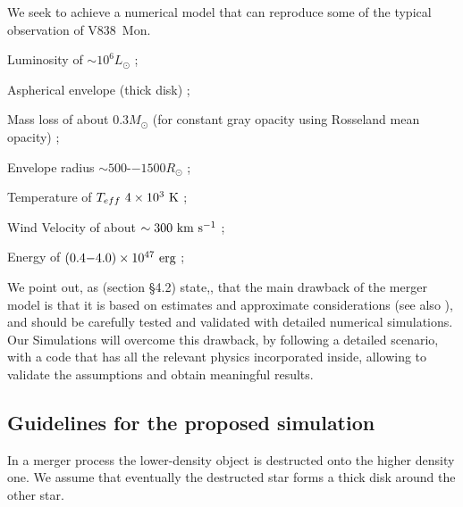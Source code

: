 \documentclass[a4paper,modern]{aastex62}
\def \kms{~\rm{km~s^{-1}}}
\def \K{~\rm{K}}
\def \erg{~\rm{erg}}
\begin{document}
We seek to achieve a numerical model that can reproduce some of the typical observation of V838~Mon.
\begin{enumerate*}[label={(\alph*)}]
\item Luminosity of $\sim 10^6 L_\odot$ \cite{2005A&A...436.1009T};
\item Aspherical envelope (thick disk) \citep{2005ApJ...622L.137L};
\item Mass loss of about $0.3M_\odot$ (for constant gray opacity using Rosseland mean opacity) \citep{2007ASPC..363..161H,2007ASPC..363...13M};
\item Envelope radius $\sim 500$-−$1500R_\odot$ \citep{2007ASPC..363..280S};
\item Temperature of $T_{eff}~4\times10^3\K$ \citep{2005A&A...436.1009T,2007ASPC..363..225P};
\item Wind Velocity of about $\sim 300 \kms$ \citep{2006A&A...451..223T,2007ASPC..363...13M};
\item Energy of $(0.4{-}4.0) \times 10^{47} \erg $ \citep{2005A&A...436.1009T};
\end{enumerate*}
We point out, as \cite{2006A&A...451..223T} (section \S4.2) state,, that the main drawback of the merger model is that it is based
on estimates and approximate considerations (see also \cite{2007ASPC..363..280S}),
and should be carefully tested and validated with detailed numerical simulations.
Our Simulations will overcome this drawback, by following a detailed scenario, with a code that has all the relevant physics incorporated inside, allowing to validate the assumptions and obtain meaningful results.


\subsection{Guidelines for the proposed simulation}

In a merger process the lower-density object is destructed onto the higher density one. We assume that eventually the destructed star forms a thick disk around the other star.
\end{document}
